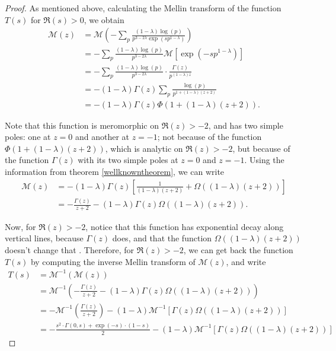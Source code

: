 \documentclass[11pt]{amsart}
\numberwithin{equation}{section}
\newcommand{\disum}{\displaystyle \sum}
\newcommand{\difrac}{\displaystyle \frac}
\begin{document}
\begin{proof} As mentioned above, calculating the Mellin transform of the function $T(s)$ for $\Re(s) > 0$, we obtain \begin{equation*} \begin{split} \mathscr{M}(z) & = \mathscr{M}\left(-\disum_p \difrac{(1 - \lambda) \log(p)}{p^{3 - 2\lambda} \exp(sp^{1 - \lambda})}\right) \\ & = -\disum_p \difrac{(1 - \lambda) \log(p)}{p^{3 - 2\lambda}} \mathscr{M}[\exp(-sp^{1 - \lambda})] \\ & = -\disum_p \difrac{(1 - \lambda) \log(p)}{p^{3 - 2\lambda}} \cdot \difrac{\Gamma(z)}{p^{(1 - \lambda)z}} \\ & = -(1 - \lambda) \Gamma(z) \disum_p \difrac{\log(p)}{p^{1 + (1 - \lambda)(z + 2)}} \\ & = -(1 - \lambda) \Gamma(z) \Phi(1 + (1 - \lambda)(z + 2)). \end{split} \end{equation*}

Note that this function is meromorphic on $\Re(z) > -2$, and has two simple poles: one at $z = 0$ and another at $z = -1$; not because of the function $\Phi(1 + (1 - \lambda)(z + 2))$, which is analytic on $\Re(z) > -2$, but because of the function $\Gamma(z)$ with its two simple poles at $z = 0$ and $z = -1$. Using the information from theorem \ref{wellknowntheorem}, we can write \begin{equation*} \begin{split} \mathscr{M}(z) & = -(1 - \lambda) \Gamma(z) \left[\difrac{1}{(1 - \lambda)(z + 2)} + \Omega((1 - \lambda)(z + 2))\right] \\ & = -\difrac{\Gamma(z)}{z + 2} - (1 - \lambda) \Gamma(z) \Omega((1 - \lambda)(z + 2)). \end{split} \end{equation*}

Now, for $\Re(z) > -2$, notice that this function has exponential decay along vertical lines, because $\Gamma(z)$ does, and that the function $\Omega((1 - \lambda)(z + 2))$ doesn't change that . Therefore, for $\Re(z) > -2$, we can get back the function $T(s)$ by computing the inverse Mellin transform of $\mathscr{M}(z)$, and write \begin{equation*} \begin{split} T(s) & = \mathscr{M}^{-1}(\mathscr{M}(z)) \\ & = \mathscr{M}^{-1}\left(-\difrac{\Gamma(z)}{z + 2} - (1 - \lambda) \Gamma(z) \Omega((1 - \lambda)(z + 2))\right) \\ & = -\mathscr{M}^{-1}\left(\difrac{\Gamma(z)}{z + 2}\right) - (1 - \lambda) \mathscr{M}^{-1}[\Gamma(z) \Omega((1 - \lambda)(z + 2))] \\ & = -\difrac{s^2 \cdot \Gamma(0,s) + \exp(-s) \cdot (1-s)}{2} - (1 - \lambda) \mathscr{M}^{-1}[\Gamma(z) \Omega((1 - \lambda)(z + 2))] \end{split} \end{equation*}


\end{proof}
\end{document}
